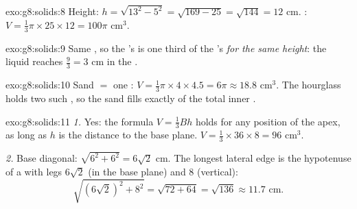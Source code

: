 \begin{solution}{exo:g8:solids:8}
Height: $h = \sqrt{13^2 - 5^2} = \sqrt{169 - 25} = \sqrt{144} = 12$
cm. : $V = \frac13 \pi \times 25 \times 12 = 100\pi$ cm$^3$.
\end{solution}

\begin{solution}{exo:g8:solids:9}
Same , so the 's  is one third of the 's
 \emph{for the same height}: the liquid reaches
$\frac{9}{3} = 3$ cm in the .
\end{solution}

\begin{solution}{exo:g8:solids:10}
Sand $=$ one : $V = \frac13 \pi \times 4 \times 4.5 = 6\pi
\approx 18.8$ cm$^3$. The hourglass holds two such , so the
sand fills exactly  of the total inner .
\end{solution}

\begin{solution}{exo:g8:solids:11}
\emph{1.} Yes: the formula $V = \frac13 Bh$ holds for any position of
the apex, as long as $h$ is the  distance to the base
plane. $V = \frac13 \times 36 \times 8 = 96$ cm$^3$.

\emph{2.} Base diagonal: $\sqrt{6^2 + 6^2} = 6\sqrt2$ cm. The longest
lateral edge is the hypotenuse of a  with legs
$6\sqrt2$ (in the base plane) and $8$ (vertical):
\[
\sqrt{(6\sqrt2)^2 + 8^2} = \sqrt{72 + 64} = \sqrt{136} \approx 11.7
\text{ cm}.
\]
\end{solution}

